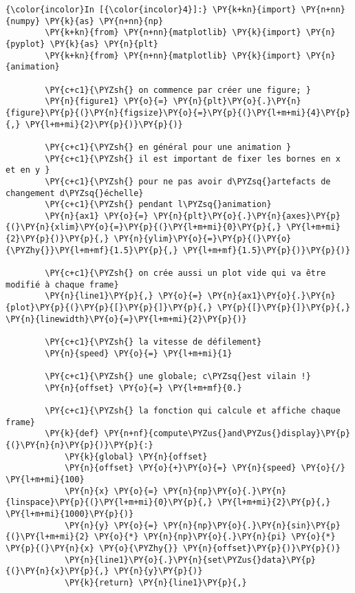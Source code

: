     \begin{Verbatim}[commandchars=\\\{\}]
{\color{incolor}In [{\color{incolor}4}]:} \PY{k+kn}{import} \PY{n+nn}{numpy} \PY{k}{as} \PY{n+nn}{np}
        \PY{k+kn}{from} \PY{n+nn}{matplotlib} \PY{k}{import} \PY{n}{pyplot} \PY{k}{as} \PY{n}{plt}
        \PY{k+kn}{from} \PY{n+nn}{matplotlib} \PY{k}{import} \PY{n}{animation}
        
        \PY{c+c1}{\PYZsh{} on commence par créer une figure; }
        \PY{n}{figure1} \PY{o}{=} \PY{n}{plt}\PY{o}{.}\PY{n}{figure}\PY{p}{(}\PY{n}{figsize}\PY{o}{=}\PY{p}{(}\PY{l+m+mi}{4}\PY{p}{,} \PY{l+m+mi}{2}\PY{p}{)}\PY{p}{)}
        
        \PY{c+c1}{\PYZsh{} en général pour une animation }
        \PY{c+c1}{\PYZsh{} il est important de fixer les bornes en x et en y }
        \PY{c+c1}{\PYZsh{} pour ne pas avoir d\PYZsq{}artefacts de changement d\PYZsq{}échelle}
        \PY{c+c1}{\PYZsh{} pendant l\PYZsq{}animation}
        \PY{n}{ax1} \PY{o}{=} \PY{n}{plt}\PY{o}{.}\PY{n}{axes}\PY{p}{(}\PY{n}{xlim}\PY{o}{=}\PY{p}{(}\PY{l+m+mi}{0}\PY{p}{,} \PY{l+m+mi}{2}\PY{p}{)}\PY{p}{,} \PY{n}{ylim}\PY{o}{=}\PY{p}{(}\PY{o}{\PYZhy{}}\PY{l+m+mf}{1.5}\PY{p}{,} \PY{l+m+mf}{1.5}\PY{p}{)}\PY{p}{)}
        
        \PY{c+c1}{\PYZsh{} on crée aussi un plot vide qui va être modifié à chaque frame}
        \PY{n}{line1}\PY{p}{,} \PY{o}{=} \PY{n}{ax1}\PY{o}{.}\PY{n}{plot}\PY{p}{(}\PY{p}{[}\PY{p}{]}\PY{p}{,} \PY{p}{[}\PY{p}{]}\PY{p}{,} \PY{n}{linewidth}\PY{o}{=}\PY{l+m+mi}{2}\PY{p}{)}
        
        \PY{c+c1}{\PYZsh{} la vitesse de défilement}
        \PY{n}{speed} \PY{o}{=} \PY{l+m+mi}{1}
        
        \PY{c+c1}{\PYZsh{} une globale; c\PYZsq{}est vilain !}
        \PY{n}{offset} \PY{o}{=} \PY{l+m+mf}{0.}
        
        \PY{c+c1}{\PYZsh{} la fonction qui calcule et affiche chaque frame}
        \PY{k}{def} \PY{n+nf}{compute\PYZus{}and\PYZus{}display}\PY{p}{(}\PY{n}{n}\PY{p}{)}\PY{p}{:}
            \PY{k}{global} \PY{n}{offset}
            \PY{n}{offset} \PY{o}{+}\PY{o}{=} \PY{n}{speed} \PY{o}{/} \PY{l+m+mi}{100}
            \PY{n}{x} \PY{o}{=} \PY{n}{np}\PY{o}{.}\PY{n}{linspace}\PY{p}{(}\PY{l+m+mi}{0}\PY{p}{,} \PY{l+m+mi}{2}\PY{p}{,} \PY{l+m+mi}{1000}\PY{p}{)}
            \PY{n}{y} \PY{o}{=} \PY{n}{np}\PY{o}{.}\PY{n}{sin}\PY{p}{(}\PY{l+m+mi}{2} \PY{o}{*} \PY{n}{np}\PY{o}{.}\PY{n}{pi} \PY{o}{*} \PY{p}{(}\PY{n}{x} \PY{o}{\PYZhy{}} \PY{n}{offset}\PY{p}{)}\PY{p}{)}
            \PY{n}{line1}\PY{o}{.}\PY{n}{set\PYZus{}data}\PY{p}{(}\PY{n}{x}\PY{p}{,} \PY{n}{y}\PY{p}{)}
            \PY{k}{return} \PY{n}{line1}\PY{p}{,}
        

\end{Verbatim}
